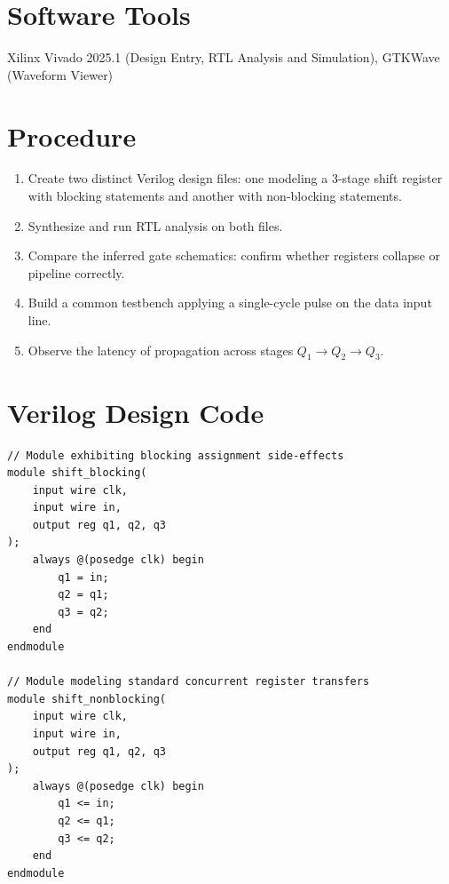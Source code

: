 \documentclass[12pt,a4paper]{report}
\begin{document}
\vspace{0.5cm}

\section{Software Tools}

Xilinx Vivado 2025.1 (Design Entry, RTL Analysis and Simulation), GTKWave (Waveform Viewer)

\section{Procedure}

\begin{enumerate}
    \item Create two distinct Verilog design files: one modeling a 3-stage shift register with blocking statements and another with non-blocking statements.
    \item Synthesize and run RTL analysis on both files.
    \item Compare the inferred gate schematics: confirm whether registers collapse or pipeline correctly.
    \item Build a common testbench applying a single-cycle pulse on the data input line.
    \item Observe the latency of propagation across stages $Q_1 \rightarrow Q_2 \rightarrow Q_3$.
\end{enumerate}



\section{Verilog Design Code}

\begin{verilogbox}
\begin{lstlisting}
// Module exhibiting blocking assignment side-effects
module shift_blocking(
    input wire clk,
    input wire in,
    output reg q1, q2, q3
);
    always @(posedge clk) begin
        q1 = in;
        q2 = q1;
        q3 = q2;
    end
endmodule

// Module modeling standard concurrent register transfers
module shift_nonblocking(
    input wire clk,
    input wire in,
    output reg q1, q2, q3
);
    always @(posedge clk) begin
        q1 <= in;
        q2 <= q1;
        q3 <= q2;
    end
endmodule
\end{lstlisting}
\end{verilogbox}
\end{document}
